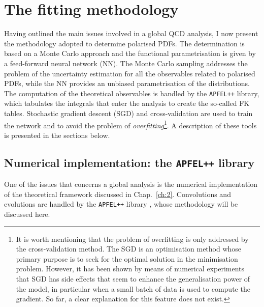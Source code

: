 \section{The fitting methodology}
\label{sec:MAP}
Having outlined the main issues involved in a global QCD analysis, I now present the methodology adopted to determine polarised PDFs. The determination is based on a Monte Carlo approach and the functional parametrisation is given by a feed-forward neural network (NN). The Monte Carlo sampling addresses the problem of the uncertainty estimation for all the observables related to polarised PDFs, while the NN provides an unbiased parametrisation of the distributions. The computation of the theoretical observables is handled by the \texttt{APFEL++} library, which tabulates the integrals that enter the analysis to create the so-called FK tables. Stochastic gradient descent (SGD) and cross-validation are used to train the network and to avoid the problem of \textit{overfitting}\footnote{\footnotesize It is worth mentioning that the problem of overfitting is only addressed by the cross-validation method. The SGD is an optimisation method whose primary purpose is to seek for the optimal solution in the minimisation problem. However, it has been shown by means of numerical experiments~\cite{2016arXiv160904836S} that SGD has side effects that seem to enhance the generalisation power of the model, in particular when a small batch of data is used to compute the gradient. So far, a clear explanation for this feature does not exist.}. A description of these tools is presented in the sections below.

\subsection{Numerical implementation: the \texttt{APFEL++} library}
\label{subsec:APFEL}
One of the issues that concerns a global analysis is the numerical implementation of the theoretical framework discussed in Chap.~\ref{ch:2}. Convolutions and evolutions are handled by the \texttt{APFEL++} library \cite{Bertone:2016lga,Bertone:2017gds}, whose methodology will be discussed here.%

